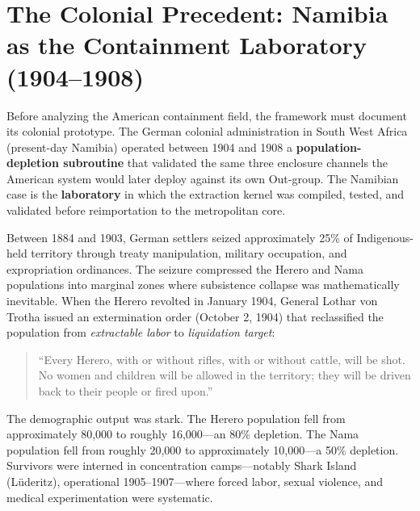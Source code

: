 \section{The Colonial Precedent: Namibia as the Containment Laboratory (1904--1908)}
\label{sec:namibia_precedent}

Before analyzing the American containment field, the framework must document its colonial prototype. The German colonial administration in South West Africa (present-day Namibia) operated between 1904 and 1908 a \textbf{population-depletion subroutine} that validated the same three enclosure channels the American system would later deploy against its own Out-group. The Namibian case is the \textbf{laboratory} in which the extraction kernel was compiled, tested, and validated before reimportation to the metropolitan core.

Between 1884 and 1903, German settlers seized approximately 25\% of Indigenous-held territory through treaty manipulation, military occupation, and expropriation ordinances. The seizure compressed the Herero and Nama populations into marginal zones where subsistence collapse was mathematically inevitable. When the Herero revolted in January 1904, General Lothar von Trotha issued an extermination order (October 2, 1904) that reclassified the population from \textit{extractable labor} to \textit{liquidation target}:
\begin{quote}
``Every Herero, with or without rifles, with or without cattle, will be shot. No women and children will be allowed in the territory; they will be driven back to their people or fired upon.''
\end{quote}

The demographic output was stark. The Herero population fell from approximately 80,000 to roughly 16,000---an 80\% depletion. The Nama population fell from roughly 20,000 to approximately 10,000---a 50\% depletion. Survivors were interned in concentration camps---notably Shark Island (L\"uderitz), operational 1905--1907---where forced labor, sexual violence, and medical experimentation were systematic.

